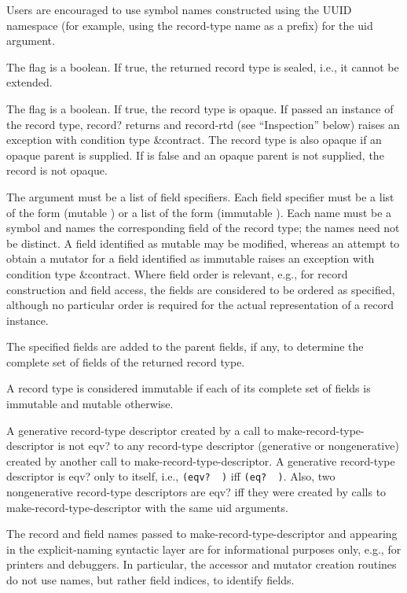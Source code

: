 \begin{entry}{%
}
\begin{note}   
  Users are encouraged to use symbol names
  constructed using the UUID namespace (for example, using the
  record-type name as a prefix) for the uid argument.
\end{note}

The  flag is a boolean. If true, the returned record type
is sealed, i.e., it cannot be extended.

The  flag is a boolean. If true, the record type
is opaque.
If passed an instance of the record type,
{\cf record?} returns
\schfalse{} and {\cf record-rtd} (see ``Inspection'' below) raises
an exception with condition type {\cf\&contract}.
The record type is also opaque if an opaque parent is
supplied.  If  is false and an opaque parent is not
supplied, the record is not opaque.

The  argument must be a list of field specifiers. Each
field specifier must be a list of the form {\cf (mutable )}
or a list of the form {\cf (immutable )}.
Each name must be a symbol and names the corresponding field of the record
type; the names need not be distinct.  A field identified as mutable may
be modified, whereas an attempt to obtain a mutator for a field identified
as immutable raises an exception with condition type {\cf\&contract}.
Where field order is relevant, e.g., for record construction and field
access, the fields are considered to be ordered as specified, although
no particular order is required for the actual representation of a
record instance.

The specified fields are added to the parent fields, if any, to determine
the complete set of fields of the returned record type.

A record type is considered immutable if each of its complete set of
fields is immutable and mutable otherwise.

A generative record-type descriptor created by a call to {\cf
  make-record-type-descriptor} is not {\cf eqv?} to any record-type
descriptor (generative or nongenerative) created by another call to
{\cf make-record-type-descriptor}. A generative record-type descriptor
is {\cf eqv?}  only to itself, i.e., {\tt (eqv?~ )} iff
{\tt (eq?~ )}.
Also, two nongenerative record-type descriptors are {\cf eqv?} iff they were
created by calls to {\cf make-record-type-descriptor} with the same
uid arguments.

\begin{rationale}
  The record and field names passed to
  {\cf make-record-type-descriptor} and appearing in the explicit-naming
  syntactic layer are for informational purposes only, e.g., for
  printers and debuggers.
  In particular, the accessor and mutator creation routines do not use
  names, but rather field indices, to identify fields.
  

\end{rationale}
\end{entry}
